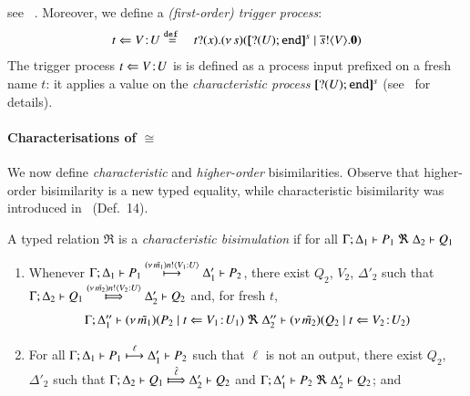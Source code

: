 \documentclass[runningheads]{llncs}
\begin{document}
{see%
~\cite{characteristic_bis}.
Moreover, we define a \emph{(first-order) trigger process}:
%
\begin{eqnarray}
	t \Leftarrow V \! : \! U & \stackrel{\mathtt{def}\ }{=} &  t ? (x) . (\nu\, s)([\!\![? (U) ; \mathtt{end}]\!\!]^{s} \;|\; \overline{s} ! \langle V \rangle . \mathbf{0}) 	\label{eq:fot}
\end{eqnarray}
%
\noi
The trigger process $t \Leftarrow V \! : \! U$ is 
is defined as a process input prefixed on
a fresh name $t$: it
applies a value
on the %
\emph{characteristic process} $[\!\![? (U) ; \mathtt{end}]\!\!]^{s}$ (see~\cite{characteristic_bis} for details). 

\paragraph{Characterisations of $\cong$}
We now define \emph{characteristic} and \emph{higher-order} bisimilarities.
Observe that higher-order bisimilarity is a new typed equality, 
while 
characteristic bisimilarity was introduced in~\cite{characteristic_bis} (Def.~14).

\begin{definition}%
	\label{d:fwb}
	A typed relation $\Re$ is a {\em  characteristic bisimulation} if 
	for all $\Gamma; \Delta_1 \vdash P_1 \ \Re \  \Delta_2 \vdash Q_1$ 
	\begin{enumerate}[1)]
		\item 
				Whenever 
				$\Gamma; \Delta_1 \vdash P_1 \stackrel{(\nu\, \tilde{m_1}) n ! \langle V_1: U \rangle}{\longmapsto} \Delta_1' \vdash P_2$,
				there exist 
				$Q_2$, $V_2$, $\Delta'_2$
				such that \\
				$\horel{\Gamma}{\Delta_2}{Q_1}{\Hby{\news{\tilde{m_2}} \bactout{n}{V_2: U}}}{\Delta_2'}{Q_2}$ and, for fresh $t$, 
%
				\[
					\begin{array}{lrlll}
						\Gamma; \Delta''_1  \vdash  {(\nu\, \tilde{m_1})(P_2 \;|\;t \Leftarrow V_1 \! : \! U_1)}
						\ \Re \
						\Delta''_2 \vdash {(\nu\, \tilde{m_2})(Q_2 \;|\;t \Leftarrow V_2 \! : \! U_2)}
					\end{array}
				\]

		\item	
				For all $\Gamma; \Delta_1 \vdash P_1 \stackrel{\ell}{\longmapsto} \Delta_1' \vdash P_2$ such that 
				$\ell$ is not an output, 
				there exist $Q_2$, $\Delta'_2$ such that 
				$\horel{\Gamma}{\Delta_2}{Q_1}{\Hby{\hat{\ell}}}{\Delta_2'}{Q_2}$
				and
				$\Gamma; \Delta_1' \vdash P_2 \ \Re \  \Delta_2' \vdash Q_2$; and 


\end{enumerate}
\end{definition}}
\end{document}
